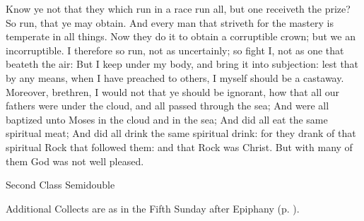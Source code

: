  Know ye not that they which run in a race run all, but one receiveth the prize? So run, that ye may obtain. And every man that striveth for the mastery is temperate in all things. Now they do it to obtain a corruptible crown; but we an incorruptible. I therefore so run, not as uncertainly; so fight I, not as one that beateth the air: But I keep under my body, and bring it into subjection: lest that by any means, when I have preached to others, I myself should be a castaway. Moreover, brethren, I would not that ye should be ignorant, how that all our fathers were under the cloud, and all passed through the sea; And were all baptized unto Moses in the cloud and in the sea; And did all eat the same spiritual meat; And did all drink the same spiritual drink: for they drank of that spiritual Rock that followed them: and that Rock was Christ. But with many of them God was not well pleased.


\begin{inhead}
{Second Class Semidouble}
\end{inhead}

\begin{rubric}
    Additional Collects are as in the Fifth Sunday after Epiphany (p. \pageref{EpiphanyV}).
\end{rubric}

